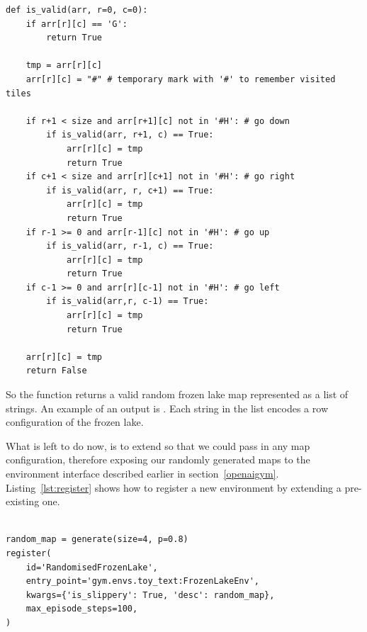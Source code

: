 \begin{minipage}{\linewidth}
\lstset{language=Python}
\lstset{frame=lines}
\lstset{basicstyle=\footnotesize}
\begin{lstlisting}
def is_valid(arr, r=0, c=0):
    if arr[r][c] == 'G':
        return True

    tmp = arr[r][c]
    arr[r][c] = "#" # temporary mark with '#' to remember visited tiles
    
    if r+1 < size and arr[r+1][c] not in '#H': # go down
        if is_valid(arr, r+1, c) == True:
            arr[r][c] = tmp
            return True
    if c+1 < size and arr[r][c+1] not in '#H': # go right
        if is_valid(arr, r, c+1) == True:
            arr[r][c] = tmp
            return True
    if r-1 >= 0 and arr[r-1][c] not in '#H': # go up
        if is_valid(arr, r-1, c) == True:
            arr[r][c] = tmp
            return True
    if c-1 >= 0 and arr[r][c-1] not in '#H': # go left
        if is_valid(arr,r, c-1) == True:
            arr[r][c] = tmp
            return True
            
    arr[r][c] = tmp
    return False
\end{lstlisting}
\end{minipage}

So the  function returns a valid random frozen lake map represented as a list of strings. An example of an output is . Each string in the list encodes a row configuration of the frozen lake.

What is left to do now, is to extend  so that we could pass in any map configuration, therefore exposing our randomly generated maps to the  environment interface described earlier in section~\ref{openaigym}. Listing~\ref{lst:register} shows how to register a new environment by extending a pre-existing one.
\\\\
\begin{minipage}{\linewidth}
\lstset{language=Python}
\lstset{frame=lines}
\lstset{basicstyle=\footnotesize}
\begin{lstlisting}
random_map = generate(size=4, p=0.8)
register(
    id='RandomisedFrozenLake',
    entry_point='gym.envs.toy_text:FrozenLakeEnv',
    kwargs={'is_slippery': True, 'desc': random_map},
    max_episode_steps=100,
)
\end{lstlisting}
\end{minipage}

